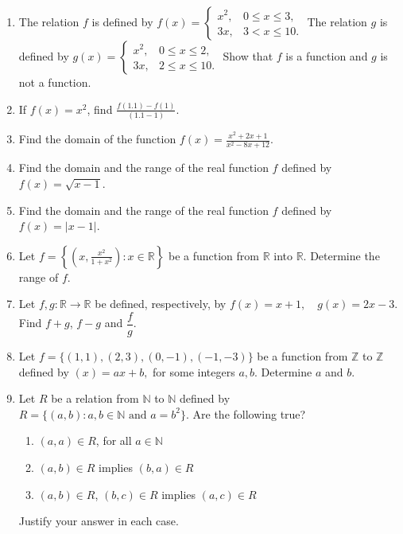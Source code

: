 \documentclass[11pt]{article}
\begin{document}
\begin{enumerate}

\item The relation $f$ is defined by
$f(x)=\begin{cases}
x^2, & 0 \le x \le 3,\\
3x, & 3 < x \le 10.
\end{cases}$
The relation $g$ is defined by
$g(x)=\begin{cases}
x^2, & 0 \le x \le 2,\\
3x, & 2 \le x \le 10.
\end{cases}$
Show that $f$ is a function and $g$ is not a function.

\item If $f(x)=x^2$, find
$\frac{f(1.1)-f(1)}{(1.1-1)}.$

\item Find the domain of the function
$f(x)=\frac{x^2+2x+1}{x^2-8x+12}.$

\item Find the domain and the range of the real function $f$ defined by
$f(x)=\sqrt{x-1}.$

\item Find the domain and the range of the real function $f$ defined by
$f(x)=|x-1|.$

\item Let
$f=\left\{\left(x,\frac{x^2}{1+x^2}\right):x\in \mathbb{R}\right\}$
be a function from $\mathbb{R}$ into $\mathbb{R}$. Determine the range of $f$.

\item Let $f,g:\mathbb{R}\to\mathbb{R}$ be defined, respectively, by
$f(x)=x+1,\quad g(x)=2x-3.$
Find $f+g$, $f-g$ and $\dfrac{f}{g}$.

\item Let
$f=\{(1,1),(2,3),(0,-1),(-1,-3)\}$
be a function from $\mathbb{Z}$ to $\mathbb{Z}$ defined by
$(x)=ax+b,$
for some integers $a,b$. Determine $a$ and $b$.

\item Let $R$ be a relation from $\mathbb{N}$ to $\mathbb{N}$ defined by
$R=\{(a,b):a,b\in\mathbb{N}\text{ and }a=b^2\}.$
Are the following true?
\begin{enumerate}
\item $(a,a)\in R$, for all $a\in\mathbb{N}$
\item $(a,b)\in R$ implies $(b,a)\in R$
\item $(a,b)\in R$, $(b,c)\in R$ implies $(a,c)\in R$
\end{enumerate}
Justify your answer in each case.


\end{enumerate}
\end{document}
